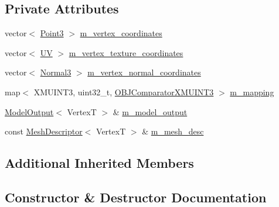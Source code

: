 \subsection*{Private Attributes}
\begin{DoxyCompactItemize}
\item 
vector$<$ \hyperlink{structmage_1_1_point3}{Point3} $>$ \hyperlink{classmage_1_1_o_b_j_reader_a1032eb4a6844a99f1d96fc17c3e52aee}{m\+\_\+vertex\+\_\+coordinates}
\item 
vector$<$ \hyperlink{structmage_1_1_u_v}{UV} $>$ \hyperlink{classmage_1_1_o_b_j_reader_aec7c093d380be0b8506f7b8fdf9c3ad1}{m\+\_\+vertex\+\_\+texture\+\_\+coordinates}
\item 
vector$<$ \hyperlink{structmage_1_1_normal3}{Normal3} $>$ \hyperlink{classmage_1_1_o_b_j_reader_a765e87afe7bd138dadcfc8c194311ed3}{m\+\_\+vertex\+\_\+normal\+\_\+coordinates}
\item 
map$<$ X\+M\+U\+I\+N\+T3, uint32\+\_\+t, \hyperlink{structmage_1_1_o_b_j_reader_1_1_o_b_j_comparator_x_m_u_i_n_t3}{O\+B\+J\+Comparator\+X\+M\+U\+I\+N\+T3} $>$ \hyperlink{classmage_1_1_o_b_j_reader_a3783d5387bcba3d593437f9e2c350387}{m\+\_\+mapping}
\item 
\hyperlink{structmage_1_1_model_output}{Model\+Output}$<$ VertexT $>$ \& \hyperlink{classmage_1_1_o_b_j_reader_ad4691c59a3e3ecefd201a8f03528bbd8}{m\+\_\+model\+\_\+output}
\item 
const \hyperlink{structmage_1_1_mesh_descriptor}{Mesh\+Descriptor}$<$ VertexT $>$ \& \hyperlink{classmage_1_1_o_b_j_reader_a3395a44a17a5749a332751465cece640}{m\+\_\+mesh\+\_\+desc}
\end{DoxyCompactItemize}
\subsection*{Additional Inherited Members}


\subsection{Constructor \& Destructor Documentation}
\hypertarget{classmage_1_1_o_b_j_reader_a87c63bd4beb00ce03be5395a37d2a0ac}{}\label{classmage_1_1_o_b_j_reader_a87c63bd4beb00ce03be5395a37d2a0ac} 
